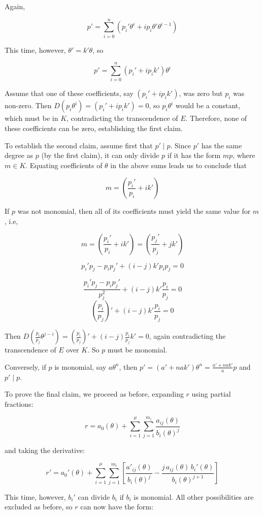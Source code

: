 \proof

Again,

$$p' = \sum_{i=0}^n (p_i' \theta^i + i p_i \theta' \theta^{i-1})$$

This time, however, $\theta' = k'\theta$, so

$$p' = \sum_{i=0}^n (p_i' + i p_i k') \theta^i$$

Assume that one of these coefficients, say $(p_i' + i p_i k')$, was
zero but $p_i$ was non-zero.  Then $D(p_i \theta^i) = (p_i' + i p_i
k') = 0$, so $p_i \theta^i$ would be a constant, which must be in $K$,
contradicting the transcendence of $E$.  Therefore, none of these
coefficients can be zero, establishing the first claim.

To establish the second claim, assume first that $p' \mid p$.  Since
$p'$ has the same degree as $p$ (by the first claim), it can only
divide $p$ if it has the form $mp$, where $m \in K$.  Equating
coefficients of $\theta$ in the above sums leads us to conclude that

$$m = (\frac{p_i'}{p_i} + i k')$$

If $p$ was not monomial, then all of its coefficients must
yield the same value for $m$, i.e,

$$m = (\frac{p_i'}{p_i} + i k') = (\frac{p_j'}{p_j} + j k')$$

$$p_i' p_j - p_i p_j' + (i - j) k' p_i p_j = 0$$

$$\frac{p_i' p_j - p_i p_j'}{p_j^2} + (i - j) k' \frac{p_i}{p_j} = 0$$
$$\left(\frac{p_i}{p_j}\right)' + (i - j) k' \frac{p_i}{p_j} = 0$$

Then $D(\frac{p_i}{p_j} \theta^{j-i}) = \left(\frac{p_i}{p_j}\right)'
+ (i - j) \frac{p_i}{p_j} k' = 0$, again contradicting the
transcendence of $E$ over $K$.  So $p$ must be monomial.

Conversely, if $p$ is monomial, say $a\theta^n$, then $p' = (a' +
n a k') \theta^n = \frac{a' + n a k'}{a} p$ and $p' \mid p$.

To prove the final claim, we proceed as before, expanding $r$ using
partial fractions:

$$r = a_0(\theta) + \sum_{i=1}^\mu \sum_{j=1}^{m_i} \frac{a_{ij}(\theta)}{b_i(\theta)^j}$$

and taking the derivative:

$$r' = a_0'(\theta) + \sum_{i=1}^\mu \sum_{j=1}^{m_i} \left[
\frac{a'_{ij}(\theta)}{b_i(\theta)^j} - \frac{j\, a_{ij}(\theta)\,
b_i'(\theta)}{b_i(\theta)^{j+1}} \right]$$

This time, however, $b_i'$ can divide $b_i$ if $b_i$ is monomial.  All
other possibilities are excluded as before, so $r$ can now have the
form:

